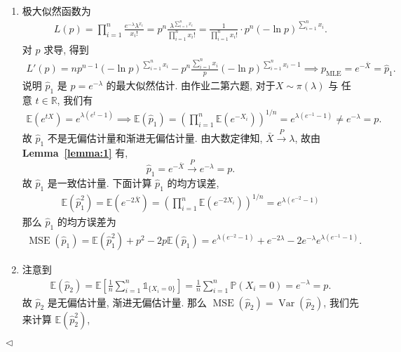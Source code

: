 \documentclass[11pt]{article}
\newenvironment{answer}[1][Solution]{\begin{trivlist}
    \item[\hskip \labelsep {\bfseries #1.}\hskip \labelsep]}{\hfill$\lhd$\end{trivlist}}
\newcommand\1{\mathds{1}}
\newcommand\R{\mathbb{R}}
\newcommand\E{\mathbb{E}}
\newcommand\PP{\mathbb{P}}
\newcommand{\arrp}{\xrightarrow{P}}
\DeclareMathOperator{\Var}{Var}
\DeclareMathOperator{\MSE}{MSE}
\begin{document}
\begin{answer}
    \begin{enumerate}[label=(\arabic*)]
        \item 极大似然函数为
        \begin{align*}
            L(p) = \prod_{i=1}^{n} \frac{e^{-\lambda}\lambda^{x_i}}{x_i!} = p^n \frac{\lambda^{\sum_{i=1}^{n}x_i}}{\prod_{i=1}^{n}x_i!} = \frac{1}{\prod_{i=1}^{n}x_i !}\cdot p^n (-\ln p)^{\sum_{i=1}^{n}x_i}.
        \end{align*}
        对 $p$ 求导, 得到
        \begin{align*}
            L'(p) = n p^{n-1}(-\ln p)^{\sum_{i=1}^{n}x_i} - p^n \frac{\sum_{i=1}^{n}x_i}{p}(-\ln p)^{\sum_{i=1}^{n}x_i - 1} \implies p_{\mathrm{MLE}} = e^{-\bar{X}} = \hat{p}_1.
        \end{align*}
        说明 $\hat{p}_1$ 是 $p = e^{-\lambda}$ 的最大似然估计. 由作业二第六题, 对于$X\sim \pi(\lambda)$ 与 任意 $t\in \R$, 我们有
        \begin{align*}
            \E\left(e^{tX}\right) = e^{\lambda(e^t - 1)} \implies \E\left(\hat{p}_1\right) =  \left(\prod_{i=1}^{n}\E\left(e^{-X_i}\right)\right)^{1/n} = e^{\lambda(e^{-1} - 1)} \neq e^{-\lambda} = p.
        \end{align*}
        故 $\hat{p}_1$ 不是无偏估计量和渐进无偏估计量. 由大数定律知, $\bar{X} \arrp \lambda$, 故由\textbf{Lemma~\ref{lemma:1}} 有, 
        \[
        \hat{p}_1 = e^{-\bar{X}} \arrp e^{-\lambda} = p.
        \] 
        故 $\hat{p}_1$ 是一致估计量. 下面计算 $\hat{p}_1$ 的均方误差,
        \begin{align*}
            \E\left(\hat{p}_1^2\right) = \E\left(e^{-2\bar{X}}\right) =  \left(\prod_{i=1}^{n}\E\left(e^{-2X_i}\right)\right)^{1/n} = e^{\lambda(e^{-2} - 1)} 
        \end{align*}
        那么 $\hat{p}_1$ 的均方误差为
        \begin{align*}
            \MSE(\hat{p}_1) = \E\left(\hat{p}_1^2\right) + p^2 - 2p\E(\hat{p}_1) = e^{\lambda(e^{-2} - 1)} + e^{-2\lambda} - 2e^{-\lambda}e^{\lambda(e^{-1} - 1)}.
        \end{align*}
        \item 注意到
        \begin{align*}
            \E\left(\hat{p}_2\right) = \E\left[\frac{1}{n}\sum_{i=1}^{n} \1_{\{X_i = 0\}}\right] = \frac{1}{n} \sum_{i=1}^{n} \PP(X_i = 0) = e^{-\lambda} = p.
        \end{align*}
        故 $\hat{p}_2$ 是无偏估计量, 渐进无偏估计量. 那么 $\MSE(\hat{p}_2) = \Var(\hat{p}_2)$, 我们先来计算 $\E\left(\hat{p}_2^2\right)$,

\end{enumerate}
\end{answer}
\end{document}
